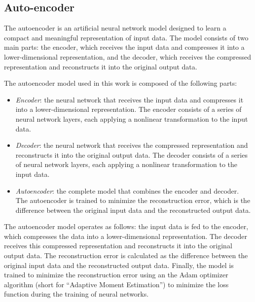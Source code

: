 \documentclass[9pt,technote]{IEEEtran}
\begin{document}
\subsection{Auto-encoder}
The autoencoder is an artificial neural network model designed to learn a compact and meaningful representation of input data. The model consists of two main parts: the encoder, which receives the input data and compresses it into a lower-dimensional representation, and the decoder, which receives the compressed representation and reconstructs it into the original output data.

The autoencoder model used in this work is composed of the following parts:
\begin{itemize}
	\item \textit{Encoder}: the neural network that receives the input data and compresses it into a lower-dimensional representation. The encoder consists of a series of neural network layers, each applying a nonlinear transformation to the input data.
	\item \textit{Decoder}: the neural network that receives the compressed representation and reconstructs it into the original output data. The decoder consists of a series of neural network layers, each applying a nonlinear transformation to the input data.
	\item \textit{Autoencoder}: the complete model that combines the encoder and decoder. The autoencoder is trained to minimize the reconstruction error, which is the difference between the original input data and the reconstructed output data.
\end{itemize}

The autoencoder model operates as follows: the input data is fed to the encoder, which compresses the data into a lower-dimensional representation. The decoder receives this compressed representation and reconstructs it into the original output data. The reconstruction error is calculated as the difference between the original input data and the reconstructed output data. Finally, the model is trained to minimize the reconstruction error using an the Adam optimizer algorithm (short for “Adaptive Moment Estimation”) to minimize the loss function during the training of neural networks.
\end{document}
